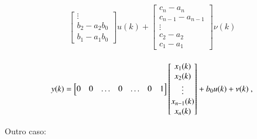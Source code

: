 \begin{eqnarray}
\begin{aligned}
\begin{bmatrix}
                    \vdots\\
                    b_2-a_2b_0\\ 
                    b_1-a_1b_0
                \end{bmatrix}
                                            u(k)
                                            +
                \begin{bmatrix}
                c_n-a_n\\ 
                c_{n-1}-a_{n-1}\\ 
                \vdots\\%
                c_2-a_2\\ 
                c_1-a_1
                \end{bmatrix}
                    \nu(k)
        \end{aligned}
    \end{eqnarray}
    
    \begin{eqnarray} \label{eq:modeloARMAXsisoSSsaída}
        \begin{aligned}
            \centering
                y(k)
                                          =
                \begin{bmatrix}
                    0   &    0   & \hdots &   0    &  \hdots  &   0    & 1
                \end{bmatrix}
                \begin{bmatrix}
                    x_1(k)\\ 
                    x_2(k)\\
                    \vdots\\
                    x_{n-1}(k)\\ 
                    x_n(k)
                \end{bmatrix}
                                            +
                                                      b_0 u(k)
                                            +
                    \nu(k) \ ,
        \end{aligned}
    \end{eqnarray}
    
    Outro caso:
    
